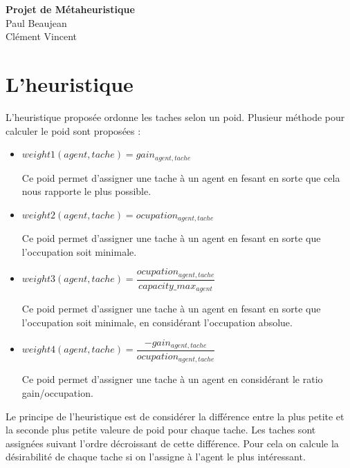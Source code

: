 \documentclass[a4paper,12pt,titlepage]{report}
\begin{document}
 \begin{titlepage}

\begin{center}




{ \huge \bfseries{Projet de Métaheuristique}}\\[0.4cm]


\vfill
{\large Paul Beaujean\\ Clément Vincent}

\end{center}

\end{titlepage}
 \clearpage
\newpage

\tableofcontents \clearpage

\chapter{L'heuristique}

L'heuristique proposée ordonne les taches selon un poid. Plusieur méthode pour calculer le poid sont proposées :
\begin{itemize} \item $weight1 (agent,tache) = gain_{agent,tache}$

Ce poid permet d'assigner une tache à un agent en fesant en sorte que cela nous rapporte le plus possible.
\item $weight2 (agent,tache) = ocupation_{agent, tache}$

Ce poid permet d'assigner une tache à un agent en fesant en sorte que l'occupation soit minimale.
\item $weight3 (agent,tache) = \dfrac{ocupation_{agent,tache}}{capacity\_max_{agent}}$

Ce poid permet d'assigner une tache à un agent en fesant en sorte que l'occupation soit minimale, en considérant l'occupation absolue.
\item $weight4 (agent,tache) = \dfrac{-gain_{agent,tache}}{ocupation_{agent,tache}}$

Ce poid permet d'assigner une tache à un agent en considérant le ratio gain/occupation.
\end{itemize}

Le principe de l'heuristique est de considérer la différence entre la plus petite et la seconde plus petite valeure de poid pour chaque tache. Les taches sont assignées suivant l'ordre décroissant de cette différence.
Pour cela on calcule la désirabilité de chaque tache si on l'assigne à l'agent le plus intéressant.
\end{document}
